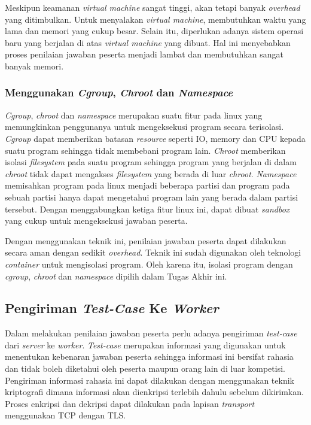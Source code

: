 \par Meskipun keamanan \textit{virtual machine} sangat tinggi, akan tetapi banyak \textit{overhead} yang ditimbulkan. Untuk menyalakan \textit{virtual machine}, membutuhkan waktu yang lama dan memori yang cukup besar. Selain itu, diperlukan adanya sistem operasi baru yang berjalan di atas \textit{virtual machine} yang dibuat. Hal ini menyebabkan proses penilaian jawaban peserta menjadi lambat dan membutuhkan sangat banyak memori.

\subsubsection{Menggunakan \textit{Cgroup}, \textit{Chroot} dan \textit{Namespace}}

\par \textit{Cgroup}, \textit{chroot} dan \textit{namespace} merupakan suatu fitur pada linux yang memungkinkan penggunanya untuk mengeksekusi program secara terisolasi. \textit{Cgroup} dapat memberikan batasan \textit{resource} seperti IO, memory dan CPU kepada suatu program sehingga tidak membebani program lain. \textit{Chroot} memberikan isolasi \textit{filesystem} pada suatu program sehingga program yang berjalan di dalam \textit{chroot} tidak dapat mengakses \textit{filesystem} yang berada di luar \textit{chroot}. \textit{Namespace} memisahkan program pada linux menjadi beberapa partisi dan program pada sebuah partisi hanya dapat mengetahui program lain yang berada dalam partisi tersebut. Dengan menggabungkan ketiga fitur linux ini, dapat dibuat \textit{sandbox} yang cukup untuk mengeksekusi jawaban peserta.

\par Dengan menggunakan teknik ini, penilaian jawaban peserta dapat dilakukan secara aman dengan sedikit \textit{overhead}. Teknik ini sudah digunakan oleh teknologi \textit{container} untuk mengisolasi program. Oleh karena itu, isolasi program dengan \textit{cgroup}, \textit{chroot} dan \textit{namespace} dipilih dalam Tugas Akhir ini.

\subsection{Pengiriman \textit{Test-Case} Ke \textit{Worker}} \label{subsec:sending-test-case-to-worker}

\par Dalam melakukan penilaian jawaban peserta perlu adanya pengiriman \textit{test-case} dari \textit{server} ke \textit{worker}. \textit{Test-case} merupakan informasi yang digunakan untuk menentukan kebenaran jawaban peserta sehingga informasi ini bersifat rahasia dan tidak boleh diketahui oleh peserta maupun orang lain di luar kompetisi. Pengiriman informasi rahasia ini dapat dilakukan dengan menggunakan teknik kriptografi dimana informasi akan dienkripsi terlebih dahulu sebelum dikirimkan. Proses enkripsi dan dekripsi dapat dilakukan pada lapisan \textit{transport} menggunakan TCP dengan TLS.

